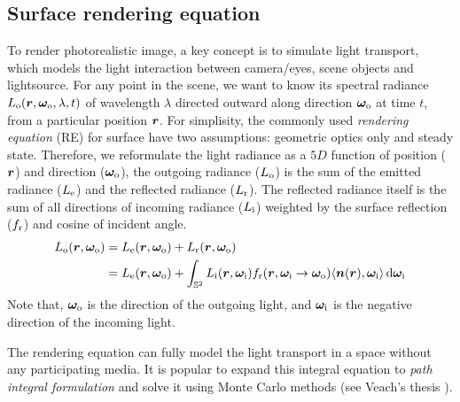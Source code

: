 \subsection{Surface rendering equation}
To render photorealistic image, a key concept is to simulate light transport, which models the light interaction between camera/eyes, scene objects and lightsource. For any point in the scene, we want to know its spectral radiance $L_\mathrm{o}(\bm{r},\bm\omega_\mathrm{o},\lambda,t)$ of wavelength $\lambda$ directed outward along direction $\bm\omega_\mathrm{o}$ at time $t$, from a particular position $\bm{r}$. For simplisity, the commonly used \emph{rendering equation} (RE) \cite{kajiya1986rendering} for surface have two assumptions: geometric optics only and steady state. Therefore, we reformulate the light radiance as a $5D$ function of position ($\bm{r}$) and direction ($\bm\omega_\mathrm{o}$), the outgoing radiance ($L_\mathrm{o}$) is the sum of the emitted radiance ($L_\mathrm{e}$) and the reflected radiance ($L_\mathrm{r}$). The reflected radiance itself is the sum of all directions of incoming radiance ($L_\mathrm{i}$) weighted by the surface reflection ($f_\mathrm{r}$) and cosine of incident angle.
\begin{equation}     	
	\begin{aligned}
		L_\mathrm{o}(\bm{r},\bm\omega_\mathrm{o}) &= L_\mathrm{e}(\bm{r},\bm\omega_\mathrm{o}) + L_\mathrm{r}(\bm{r},\bm\omega_\mathrm{o}) \\
		&= L_\mathrm{e}(\bm{r},\bm\omega_\mathrm{o}) + 
		\int_{\mathbb{S}^2} L_\mathrm{i}(\bm{r},\bm\omega_\mathrm{i}) f_\mathrm{r}(\bm{r},\bm\omega_\mathrm{i}\rightarrow\bm\omega_\mathrm{o}) {\langle \bm{n}(\bm{r}),\bm\omega_\mathrm{i} \rangle} \,\mathrm{d} \bm\omega_\mathrm{i}
	\end{aligned}
\end{equation}
Note that, $\bm\omega_\mathrm{o}$ is the direction of the outgoing light, and $\bm\omega_\mathrm{i}$ is the negative direction of the incoming light. 

The rendering equation can fully model the light transport in a space without any participating media. It is popular to expand this integral equation to \emph{path integral formulation} and solve it using Monte Carlo methods (see Veach's thesis 
\cite{veach1997metropolis}).


